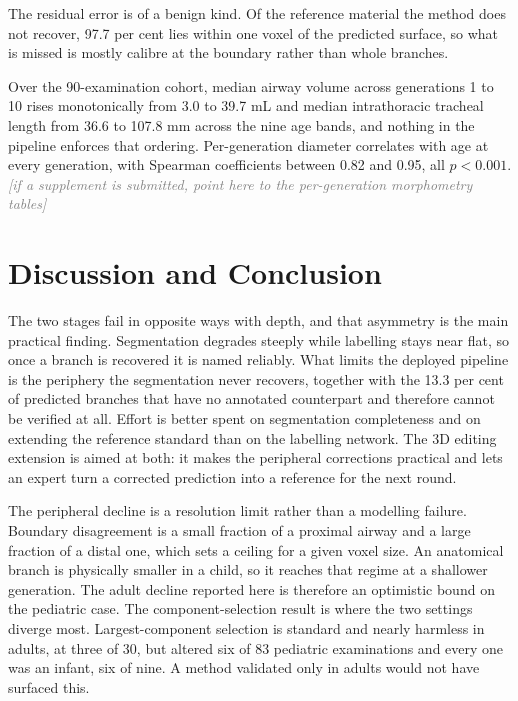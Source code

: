 \documentclass[runningheads]{llncs}
\newcommand{\todo}[1]{\textcolor{gray}{\textit{[#1]}}}
\begin{document}
The residual error is of a benign kind. Of the reference material the method
does not recover, 97.7 per cent lies within one voxel of the predicted surface,
so what is missed is mostly calibre at the boundary rather than whole branches.

Over the 90-examination cohort, median airway volume across generations 1 to 10
rises monotonically from 3.0 to 39.7 mL and median intrathoracic tracheal length
from 36.6 to 107.8 mm across the nine age bands, and nothing in the pipeline
enforces that ordering. Per-generation diameter correlates with age at every
generation, with Spearman coefficients between 0.82 and 0.95, all $p<0.001$.
\todo{if a supplement is submitted, point here to the per-generation
morphometry tables}

\section{Discussion and Conclusion}

The two stages fail in opposite ways with depth, and that asymmetry is the main
practical finding. Segmentation degrades steeply while labelling stays near
flat, so once a branch is recovered it is named reliably. What limits the
deployed pipeline is the periphery the segmentation never recovers, together
with the 13.3 per cent of predicted branches that have no annotated counterpart
and therefore cannot be verified at all. Effort is better spent on segmentation
completeness and on extending the reference standard than on the labelling
network. The 3D editing extension is aimed at both: it makes the peripheral
corrections practical and lets an expert turn a corrected prediction into a
reference for the next round.

The peripheral decline is a resolution limit rather than a modelling failure.
Boundary disagreement is a small fraction of a proximal airway and a large
fraction of a distal one, which sets a ceiling for a given voxel size. An
anatomical branch is physically smaller in a child, so it reaches that regime at
a shallower generation. The adult decline reported here is therefore an
optimistic bound on the pediatric case. The component-selection result is
where the two settings diverge most. Largest-component selection is standard and
nearly harmless in adults, at three of 30, but altered six of 83 pediatric
examinations and every one was an infant, six of nine. A method validated only
in adults would not have surfaced this.
\end{document}
